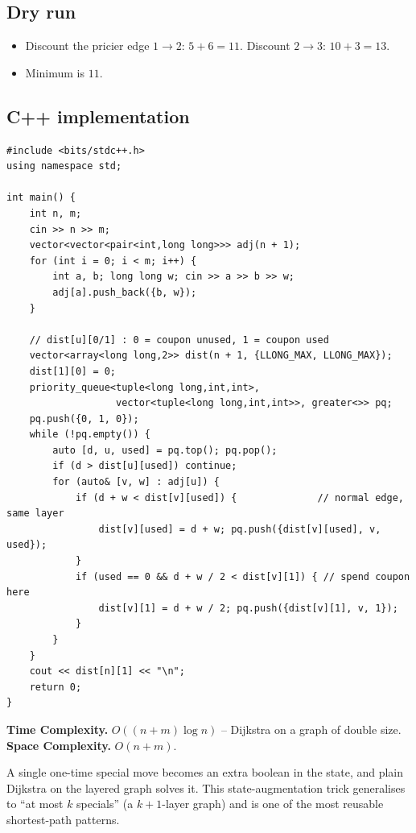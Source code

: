 \subsection*{Dry run}


\begin{itemize}
  \item Discount the pricier edge $1\!\to\!2$: $5+6=11$. Discount
        $2\!\to\!3$: $10+3=13$.
  \item Minimum is $11$.
\end{itemize}

\subsection*{C++ implementation}

\begin{lstlisting}
#include <bits/stdc++.h>
using namespace std;

int main() {
    int n, m;
    cin >> n >> m;
    vector<vector<pair<int,long long>>> adj(n + 1);
    for (int i = 0; i < m; i++) {
        int a, b; long long w; cin >> a >> b >> w;
        adj[a].push_back({b, w});
    }

    // dist[u][0/1] : 0 = coupon unused, 1 = coupon used
    vector<array<long long,2>> dist(n + 1, {LLONG_MAX, LLONG_MAX});
    dist[1][0] = 0;
    priority_queue<tuple<long long,int,int>,
                   vector<tuple<long long,int,int>>, greater<>> pq;
    pq.push({0, 1, 0});
    while (!pq.empty()) {
        auto [d, u, used] = pq.top(); pq.pop();
        if (d > dist[u][used]) continue;
        for (auto& [v, w] : adj[u]) {
            if (d + w < dist[v][used]) {              // normal edge, same layer
                dist[v][used] = d + w; pq.push({dist[v][used], v, used});
            }
            if (used == 0 && d + w / 2 < dist[v][1]) { // spend coupon here
                dist[v][1] = d + w / 2; pq.push({dist[v][1], v, 1});
            }
        }
    }
    cout << dist[n][1] << "\n";
    return 0;
}
\end{lstlisting}

\begin{complexitybox}
\textbf{Time Complexity.} $O((n+m)\log n)$ -- Dijkstra on a graph of double
size. \textbf{Space Complexity.} $O(n+m)$.
\end{complexitybox}

\begin{takeawaybox}
A single one-time special move becomes an extra boolean in the state, and
plain Dijkstra on the layered graph solves it. This state-augmentation
trick generalises to ``at most $k$ specials'' (a $k+1$-layer graph) and is
one of the most reusable shortest-path patterns.
\end{takeawaybox}
